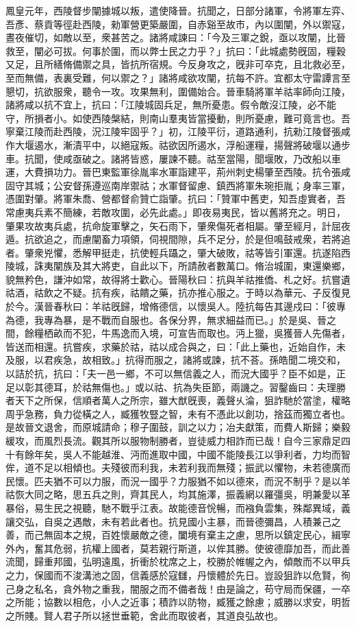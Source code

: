 \begin{pinyinscope}
鳳皇元年，西陵督步闡據城以叛，遣使降晉。抗聞之，日部分諸軍，令將軍左弈、吾彥、蔡貢等徑赴西陵，勑軍營更築嚴圍，自赤谿至故市，內以圍闡，外以禦寇，晝夜催切，如敵以至，衆甚苦之。諸將咸諫曰：「今及三軍之銳，亟以攻闡，比晉救至，闡必可拔。何事於圍，而以弊士民之力乎？」抗曰：「此城處勢旣固，糧穀又足，且所繕脩備禦之具，皆抗所宿規。今反身攻之，旣非可卒克，且北救必至，至而無備，表裏受難，何以禦之？」諸將咸欲攻闡，抗每不許。宜都太守雷譚言至懇切，抗欲服衆，聽令一攻。攻果無利，圍備始合。晉車騎將軍羊祜率師向江陵，諸將咸以抗不宜上，抗曰：「江陵城固兵足，無所憂患。假令敵沒江陵，必不能守，所損者小。如使西陵槃結，則南山羣夷皆當擾動，則所憂慮，難可竟言也。吾寧棄江陵而赴西陵，況江陵牢固乎？」初，江陵平衍，道路通利，抗勑江陵督張咸作大堰遏水，漸漬平中，以絕寇叛。祜欲因所遏水，浮船運糧，揚聲將破堰以通步車。抗聞，使咸亟破之。諸將皆惑，屢諫不聽。祜至當陽，聞堰敗，乃改船以車運，大費損功力。晉巴東監軍徐胤率水軍詣建平，荊州刺史楊肇至西陵。抗令張咸固守其城；公安督孫遵巡南岸禦祜；水軍督留慮、鎮西將軍朱琬拒胤；身率三軍，憑圍對肇。將軍朱喬、營都督俞贊亡詣肇。抗曰：「贊軍中舊吏，知吾虛實者，吾常慮夷兵素不簡練，若敵攻圍，必先此處。」即夜易夷民，皆以舊將充之。明日，肇果攻故夷兵處，抗命旋軍擊之，矢石雨下，肇衆傷死者相屬。肇至經月，計屈夜遁。抗欲追之，而慮闡畜力項領，伺視間隙，兵不足分，於是但鳴鼓戒衆，若將追者。肇衆兇懼，悉解甲挺走，抗使輕兵躡之，肇大破敗，祜等皆引軍還。抗遂陷西陵城，誅夷闡族及其大將吏，自此以下，所請赦者數萬口。脩治城圍，東還樂鄉，貌無矜色，謙沖如常，故得將士歡心。晉陽秋曰：抗與羊祜推僑、札之好。抗嘗遺祜酒，祜飲之不疑。抗有疾，祜饋之藥，抗亦推心服之。于時以為華元、子反復見於今。漢晉春秋曰：羊祜旣歸，增脩德信，以懷吳人。陸抗每告其邊戍曰：「彼專為德，我專為暴，是不戰而自服也。各保分界，無求細益而已。」於是吳、晉之間，餘糧栖畝而不犯，牛馬逸而入境，可宣告而取也。沔上獵，吳獲晉人先傷者，皆送而相還。抗嘗疾，求藥於祜，祜以成合與之，曰：「此上藥也，近始自作，未及服，以君疾急，故相致。」抗得而服之，諸將或諫，抗不荅。孫皓聞二境交和，以詰於抗，抗曰：「夫一邑一鄉，不可以無信義之人，而況大國乎？臣不如是，正足以彰其德耳，於祜無傷也。」或以祜、抗為失臣節，兩譏之。習鑿齒曰：夫理勝者天下之所保，信順者萬人之所宗，雖大猷旣喪，義聲乆淪，狙詐馳於當塗，權略周乎急務，負力從橫之人，臧獲牧豎之智，未有不憑此以創功，捨茲而獨立者也。是故晉文退舍，而原城請命；穆子圍鼓，訓之以力；冶夫獻策，而費人斯歸；樂毅緩攻，而風烈長流。觀其所以服物制勝者，豈徒威力相詐而已哉！自今三家鼎足四十有餘年矣，吳人不能越淮、沔而進取中國，中國不能陵長江以爭利者，力均而智侔，道不足以相傾也。夫殘彼而利我，未若利我而無殘；振武以懼物，未若德廣而民懷。匹夫猶不可以力服，而況一國乎？力服猶不如以德來，而況不制乎？是以羊祜恢大同之略，思五兵之則，齊其民人，均其施澤，振義網以羅彊吳，明兼愛以革暴俗，易生民之視聽，馳不戰乎江表。故能德音恱暢，而襁負雲集，殊鄰異域，義讓交弘，自吳之遇敵，未有若此者也。抗見國小主暴，而晉德彌昌，人積兼己之善，而己無固本之規，百姓懷嚴敵之德，闔境有棄主之慮，思所以鎮定民心，緝寧外內，奮其危弱，抗權上國者，莫若親行斯道，以侔其勝。使彼德靡加吾，而此善流聞，歸重邦國，弘明遠風，折衝於枕席之上，校勝於帷幄之內，傾敵而不以甲兵之力，保國而不浚溝池之固，信義感於寇讎，丹懷體於先日。豈設狙詐以危賢，徇己身之私名，貪外物之重我，闇服之而不備者哉！由是論之，苟守局而保疆，一卒之所能；協數以相危，小人之近事；積詐以防物，臧獲之餘慮；威勝以求安，明哲之所賤。賢人君子所以拯世垂範，舍此而取彼者，其道良弘故也。


\end{pinyinscope}
